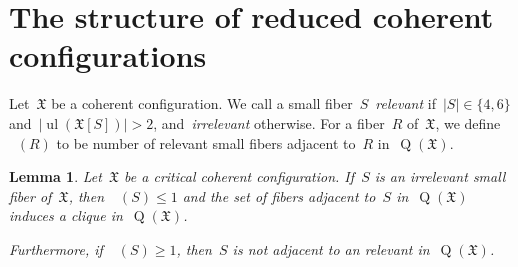\documentclass[english,a4paper]{article}
\theoremstyle{plain}
\newtheorem{lemma}      [theorem]{Lemma}
\theoremstyle{definition}
\newcommand{\coherentConfig}{\ensuremath{\mathfrak{X}}}
\newcommand{\inducedCC}[1]{\ensuremath{\coherentConfig[#1]}}
\DeclareMathOperator*{\ul}{ul}
\DeclareMathOperator*{\Quotient}{Q}
\newcommand{\quotientGraph}[1]{\ensuremath{\Quotient(#1)}}
\DeclareMathOperator{\ColorDegLarge}{cdeg_L}
\DeclareMathOperator{\ColorDegSmall}{cdeg_S}
\DeclareMathOperator{\ColorDegRelevantSmall}{cdeg_{rS}}
\newcommand{\colorDegLarge}[1]{\ensuremath{\ColorDegLarge\left(#1\right)}}
\newcommand{\colorDegSmall}[1]{\ensuremath{\ColorDegSmall\left(#1\right)}}
\newcommand{\colorDegRelevantSmall}[1]{\ensuremath{\ColorDegRelevantSmall\left(#1\right)}}
\begin{document}
     


\section{The structure of reduced coherent configurations}
\label{structure-reduced-cc/sec}

Let~$\coherentConfig$ be a coherent configuration.
We call a small fiber~$S$~\emph{relevant} if~$|S| \in \{4,6\}$ and~$|\ul(\inducedCC{S})| > 2$, and~\emph{irrelevant} otherwise.
For a fiber~$R$ of~$\coherentConfig$, we define~$\colorDegRelevantSmall{R}$ to be number of relevant small fibers adjacent to~$R$ in~$\quotientGraph{\coherentConfig}$.


\begin{lemma}
\label{irrelevant-small-fibers/lem}
    Let~$\coherentConfig$ be a critical coherent configuration.
    If~$S$ is an irrelevant small fiber of~$\coherentConfig$,
    then~$\colorDegSmall{S} \leq 1$ and the set of fibers adjacent to~$S$ in~$\quotientGraph{\coherentConfig}$ induces a clique in~$\quotientGraph{\coherentConfig}$.

    Furthermore, if~$\colorDegLarge{S} \geq 1$, then~$S$ is not adjacent to an relevant in~$\quotientGraph{\coherentConfig}$.
\end{lemma}
\end{document}
